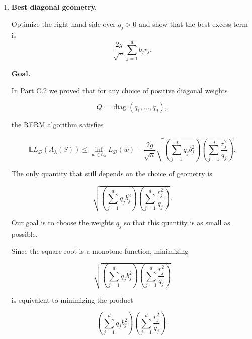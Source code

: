 \documentclass[11pt]{article}
\newcommand{\E}{\mathbb{E}}
\begin{document}
\begin{enumerate}
\begin{solutionbox}
\medskip

\textbf{Interpretation.}

The learning guarantee depends on the geometry through the product

\[
\left(
\sum_{j=1}^{d}
q_j b_j^2
\right)
\left(
\sum_{j=1}^{d}
\frac{r_j^2}{q_j}
\right).
\]

The first factor measures the size of the comparator class under the weighted regularizer, while the second measures the complexity of the feature map in the dual geometry.

Choosing the weights \(q_j\) appropriately can significantly improve the learning guarantee, which is exactly the motivation for the optimization carried out in the next part.

\end{solutionbox}

\item \textbf{Best diagonal geometry.}

Optimize the right-hand side over $q_j>0$ and show that the best excess term is
\[
\frac{2g}{\sqrt n}\sum_{j=1}^db_jr_j.
\]

\begin{solutionbox}

\textbf{Goal.}

In Part C.2 we proved that for any choice of positive diagonal weights

\[
Q=\operatorname{diag}(q_1,\ldots,q_d),
\]

the RERM algorithm satisfies

\[
\E L_{\mathcal D}(A_\lambda(S))
\le
\inf_{w\in\mathcal C_b}
L_{\mathcal D}(w)
+
\frac{2g}{\sqrt n}
\sqrt{
\left(
\sum_{j=1}^{d}
q_j b_j^2
\right)
\left(
\sum_{j=1}^{d}
\frac{r_j^2}{q_j}
\right)
}.
\]

The only quantity that still depends on the choice of geometry is

\[
\sqrt{
\left(
\sum_{j=1}^{d}
q_j b_j^2
\right)
\left(
\sum_{j=1}^{d}
\frac{r_j^2}{q_j}
\right)
}.
\]

Our goal is to choose the weights \(q_j\) so that this quantity is as small as possible.

Since the square root is a monotone function, minimizing

\[
\sqrt{
\left(
\sum_{j=1}^{d}
q_j b_j^2
\right)
\left(
\sum_{j=1}^{d}
\frac{r_j^2}{q_j}
\right)
}
\]

is equivalent to minimizing the product

\[
\left(
\sum_{j=1}^{d}
q_j b_j^2
\right)
\left(
\sum_{j=1}^{d}
\frac{r_j^2}{q_j}
\right).
\]


\end{solutionbox}
\end{enumerate}
\end{document}
